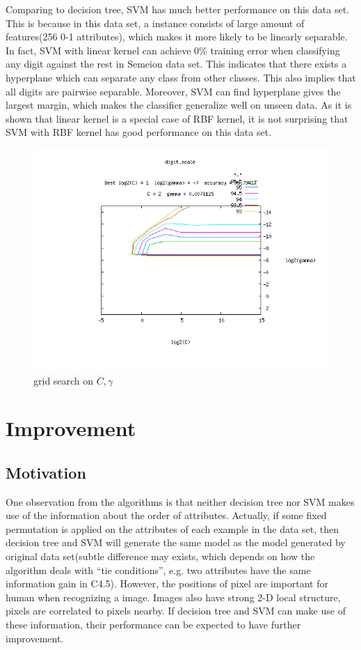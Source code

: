 \documentclass[a4paper,11pt]{article}
\begin{document}
Comparing to decision tree, SVM has much better performance on this data set. This is because in this data set, a instance consists of large amount of features(256 0-1 attributes), which makes it more likely to be linearly separable. In fact, SVM with linear kernel can achieve 0\% training error when classifying any digit against the rest in Semeion data set. This indicates that there exists a hyperplane which can separate any class from other classes. This also implies that all digits are pairwise separable. Moreover, SVM can find hyperplane gives the largest margin, which makes the classifier generalize well on unseen data. As it is shown that linear kernel is a special case of RBF kernel\cite{ssk,ll}, it is not surprising that SVM with RBF kernel has good performance on this data set.

\begin{figure}
\centering
\includegraphics[width=1.0\textwidth]{digit}
\caption{grid search on $C,\gamma$}
\end{figure}

\section{Improvement}
\subsection{Motivation}
One observation from the algorithms is that neither decision tree nor SVM makes use of the information about the order of attributes. Actually, if some fixed permutation is applied on the attributes of each example in the data set, then decision tree and SVM will generate the same model as the model generated by original data set(subtle difference may exists, which depends on how the algorithm deals with ``tie conditions'', e.g. two attributes have the same information gain in C4.5). However, the positions of pixel are important for human when recognizing a image. Images also have strong 2-D local structure, pixels are correlated to pixels nearby\cite{lecun98}. If decision tree and SVM can make use of these information, their performance can be expected to have further improvement.\\
\end{document}
